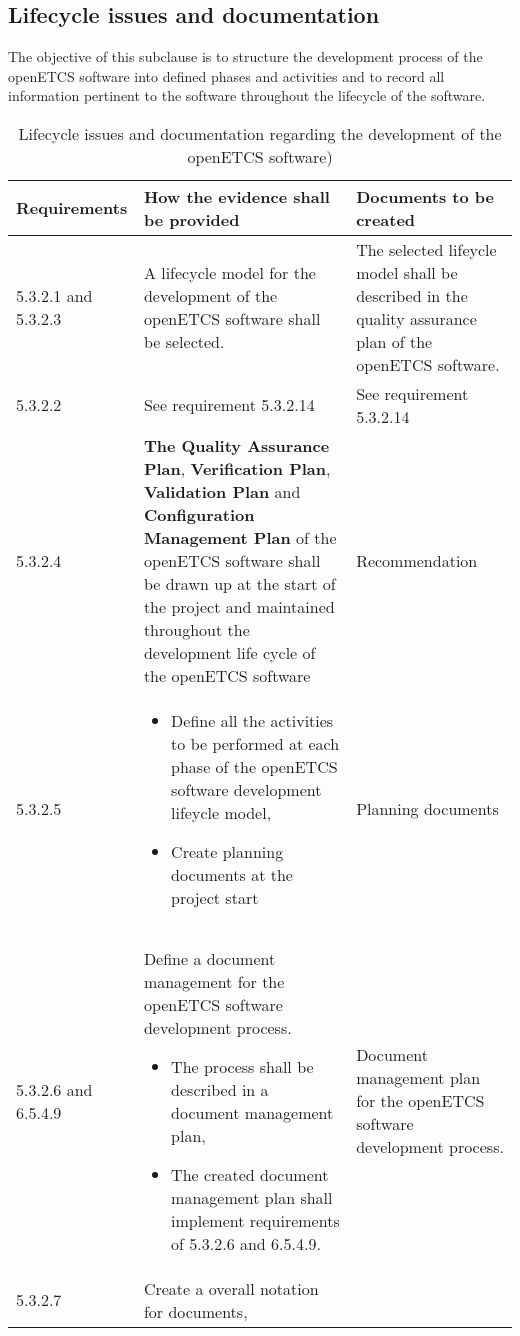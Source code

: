 \documentclass{template/openetcs_report}
\begin{document}
\subsection{Lifecycle issues and documentation}
\label{SDLC2}
\begin{flushleft}
The objective of this subclause is to structure the development process of the openETCS software into defined phases and activities and to record all information pertinent to the software throughout the lifecycle of the software.
\end{flushleft}
{\footnotesize\sffamily\centering
\begin{longtable}{|p{2cm}|p{9cm}|p{3cm}|}
\caption{Lifecycle issues and documentation regarding the development of the openETCS software)}\\
\hline
\bfseries Requirements & \bfseries How the evidence shall be provided & \bfseries Documents to be created\\
\hline
\hline
\endhead
\hline
\endfoot

5.3.2.1 and 5.3.2.3 & A lifecycle model for the development of the openETCS software shall be selected.
& The selected lifeycle model shall be described in the quality assurance plan of the openETCS software.\\ 
\hline
5.3.2.2 & See requirement 5.3.2.14 & See requirement 5.3.2.14\\ 
\hline
5.3.2.4 & \textbf{The Quality Assurance Plan}, \textbf{Verification Plan}, \textbf{Validation Plan} and \textbf{Configuration Management Plan} of the openETCS software shall be drawn up at the start of the project and maintained throughout the development life cycle of the openETCS software & Recommendation\\ 
\hline
5.3.2.5 & 
\begin{itemize}\itemsep=0pt
  \item Define all the activities to be performed at each phase of the openETCS software
development lifeycle model,
  \item Create planning documents at the project start
\end{itemize} 
& Planning documents\\ 
\hline
5.3.2.6 and 6.5.4.9 & Define a document management for the openETCS software development process. 
\begin{itemize}\itemsep=0pt
  \item The process shall be described in a document management plan,
  \item The created document management plan shall implement requirements of 5.3.2.6 and 6.5.4.9.
\end{itemize} 
& Document management plan for the openETCS software development
process.\\ 
\hline
5.3.2.7 & Create a overall notation for documents,


\end{longtable}}
\end{document}

